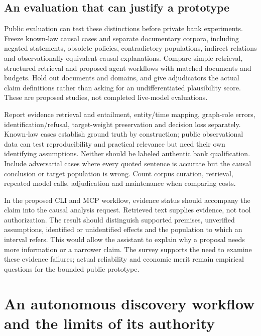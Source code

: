 \subsection{An evaluation that can justify a prototype}

Public evaluation can test these distinctions before private bank experiments.
Freeze known-law causal cases and separate documentary corpora, including
negated statements, obsolete policies, contradictory populations, indirect
relations and observationally equivalent causal explanations. Compare simple
retrieval, structured retrieval and proposed agent workflows with matched
documents and budgets. Hold out documents and domains, and give adjudicators
the actual claim definitions rather than asking for an undifferentiated
plausibility score. These are proposed studies, not completed live-model
evaluations.

Report evidence retrieval and entailment, entity/time mapping, graph-role
errors, identification/refusal, target-weight preservation and decision loss
separately. Known-law cases establish ground truth by construction; public
observational data can test reproducibility and practical relevance but need
their own identifying assumptions. Neither should be labeled authentic bank
qualification. Include adversarial cases where every quoted sentence is
accurate but the causal conclusion or target population is wrong. Count corpus
curation, retrieval, repeated model calls, adjudication and maintenance when
comparing costs.

In the proposed CLI and MCP workflow, evidence status should accompany the
claim into the causal analysis request. Retrieved text supplies evidence, not
tool authorization. The result should distinguish supported premises,
unverified assumptions, identified or unidentified effects and the population
to which an interval refers. This would allow the assistant to explain why a
proposal needs more information or a narrower claim. The survey supports the
need to examine these evidence failures; actual reliability and economic merit
remain empirical questions for the bounded public prototype.


\section{An autonomous discovery workflow and the limits of its authority}
\label{exec17:copilot-development}

